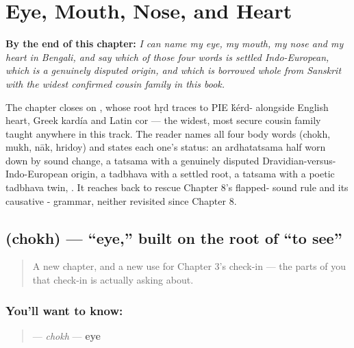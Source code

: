 
\chapter{Eye, Mouth, Nose, and Heart}
\label{ch:bn-eye-mouth-nose-heart}

\begin{chapteropening}
\textbf{By the end of this chapter:} \emph{I can name my eye, my mouth, my nose and my heart in Bengali, and say which of those four words is settled Indo-European, which is a genuinely disputed origin, and which is borrowed whole from Sanskrit with the widest confirmed cousin family in this book.}

The chapter closes on , whose root hṛd traces to PIE \'{k}érd- alongside English heart, Greek kardía and Latin cor — the widest, most secure cousin family taught anywhere in this track. The reader names all four body words (chokh, mukh, nāk, hridoy) and states each one's status:  an ardhatatsama half worn down by sound change,  a tatsama with a genuinely disputed Dravidian-versus-Indo-European origin,  a tadbhava with a settled root,  a tatsama with a poetic tadbhava twin, . It reaches back to rescue Chapter 8's flapped- sound rule and its causative - grammar, neither revisited since Chapter 8.
\end{chapteropening}

\section[chokh]{ (chokh) — \textquotedblleft{}eye,\textquotedblright{} built on the root of \textquotedblleft{}to see\textquotedblright{}}

\label{lesson:BN-C12-chokh}



\begin{quote}
A new chapter, and a new use for Chapter 3's check-in — the parts of you that check-in is actually asking about.
\end{quote}

\subsection*{You'll want to know: }
\begin{quote}
\textbf{} — \emph{chokh} — \textbf{eye}
\end{quote}

